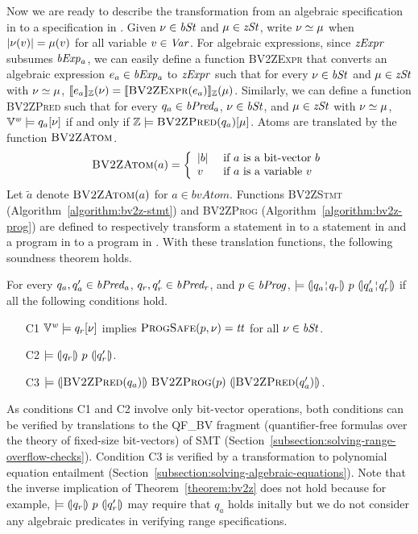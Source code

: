 Now we are ready to describe the transformation from an algebraic specification in \bvdsl to a specification in \zdsl.
Given $\nu \in \mathit{bSt}$ and $\mu \in \mathit{zSt}$, write $\nu \simeq \mu$ when $|\nu(v)| = \mu(v)$ for all variable $v \in \mathit{Var}$.
For algebraic expressions, since $\mathit{zExpr}$ subsumes $\mathit{bExp_a}$, we can easily define a function \textsc{BV2ZExpr} that converts an algebraic expression $e_a \in \mathit{bExp_a}$ to $\mathit{zExpr}$ such that for every $\nu \in \mathit{bSt}$ and $\mu \in \mathit{zSt}$ with $\nu \simeq \mu$, $[\![{e_a}]\!]_{\mathbb{Z}}(\nu) = [\![{\textsc{BV2ZExpr}(e_a)}]\!]_{\mathbb{Z}}(\mu)$.
Similarly, we can define a function \textsc{BV2ZPred} such that for every $q_a \in \mathit{bPred_a}$, $\nu \in \mathit{bSt}$, and $\mu \in \mathit{zSt}$ with $\nu \simeq \mu$, $\mathbb{V}^{\mathit{w}} \models q_a[\nu]$ if and only if $\mathbb{Z} \models \textsc{BV2ZPred}(q_a)[\mu]$.
Atoms are translated by the function $\textsc{BV2ZAtom}$.
\[
\textsc{BV2ZAtom}(a) = \left\{
  \begin{array}{ll}
  |b| & \textmd{ if $a$ is a bit-vector $b$} \\
  v   & \textmd{ if $a$ is a variable $v$}
  \end{array} \right.
\]
Let $\tilde{a}$ denote $\textsc{BV2ZAtom}(a)$ for $a \in bvAtom$.
Functions \textsc{BV2ZStmt} (Algorithm~\ref{algorithm:bv2z-stmt}) and \textsc{BV2ZProg} (Algorithm~\ref{algorithm:bv2z-prog}) are defined to respectively transform a statement in \bvdsl to a statement in \zdsl and a program in \bvdsl to a program in \zdsl.
With these translation functions, the following soundness theorem holds.
\begin{theorem}
  For every $q_a, q_a' \in \mathit{bPred_a}$, $q_r, q_r' \in \mathit{bPred_r}$, and $p \in \mathit{bProg}$, $\models \hoaretriple{q_a \andar q_r}{p}{q_a' \andar q_r'}$ if all the following conditions hold.
  \begin{itemize}
  \item[C1] $\mathbb{V}^{\mathit{w}} \models q_r[\nu]$ implies $\textsc{ProgSafe}(p, \nu) = \mathit{tt}$ for all $\nu \in \mathit{bSt}$.
  \item[C2] $\models {(\!|}{q_r}{|\!)}~{p}~{(\!|}{q_r'}{|\!)}$.
  \item[C3] $\models {(\!|}{\textsc{BV2ZPred}(q_a)}{|\!)}~{\textsc{BV2ZProg}(p)}~{(\!|}{\textsc{BV2ZPred}(q_a')}{|\!)}$.
  \end{itemize}
  \label{theorem:bv2z}
\end{theorem}
As conditions C1 and C2 involve only bit-vector operations, both conditions can be verified by translations to the QF\_BV fragment (quantifier-free formulas over the theory of fixed-size bit-vectors) of SMT (Section~\ref{subsection:solving-range-overflow-checks}).
Condition C3 is verified by a transformation to polynomial equation entailment (Section~\ref{subsection:solving-algebraic-equations}).
Note that the inverse implication of Theorem~\ref{theorem:bv2z} does not hold because for example, $\models {(\!|}{q_r}{|\!)}~{p}~{(\!|}{q_r'}{|\!)}$ may require that $q_a$ holds initally but we do not consider any algebraic predicates in verifying range specifications.

